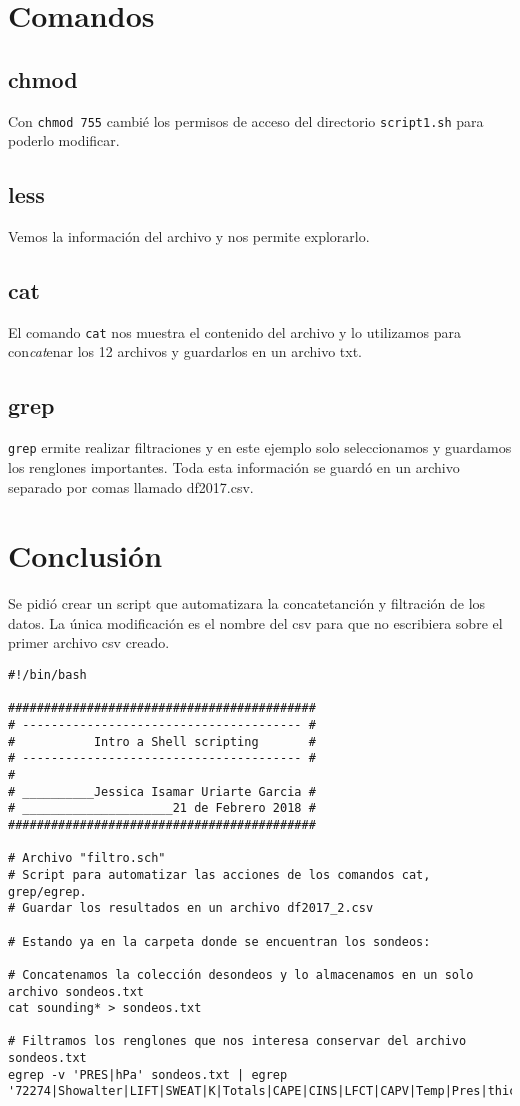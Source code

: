 \documentclass[12pt]{article}
\begin{document}
\section{Comandos}
\noindent

\subsection*{chmod}
Con \texttt{chmod 755} cambi\'e los permisos de acceso del directorio \texttt{script1.sh} para poderlo modificar. 
\subsection*{less}
Vemos la informaci\'on del archivo y nos permite explorarlo.
\subsection*{cat}
El comando \texttt{cat} nos muestra el contenido del archivo y lo utilizamos para con\textit{cat}enar los 12 archivos y guardarlos en un archivo txt.
\subsection*{grep}
\texttt{grep} ermite realizar filtraciones y en este ejemplo solo seleccionamos y guardamos los renglones importantes. Toda esta informaci\'on se guard\'o en un archivo separado por comas llamado df2017.csv.


\section{Conclusi\'on}
\noindent
Se pidi\'o crear un script que automatizara la concatetanci\'on y filtraci\'on de los datos. La \'unica modificaci\'on es el nombre del csv para que no escribiera sobre el primer archivo csv creado. 
\begin{verbatim}
#!/bin/bash

###########################################
# --------------------------------------- #
#           Intro a Shell scripting       #
# --------------------------------------- #
#
# __________Jessica Isamar Uriarte Garcia #
# _____________________21 de Febrero 2018 #
###########################################

# Archivo "filtro.sch"
# Script para automatizar las acciones de los comandos cat, grep/egrep.
# Guardar los resultados en un archivo df2017_2.csv

# Estando ya en la carpeta donde se encuentran los sondeos:

# Concatenamos la colección desondeos y lo almacenamos en un solo archivo sondeos.txt
cat sounding* > sondeos.txt

# Filtramos los renglones que nos interesa conservar del archivo sondeos.txt
egrep -v 'PRES|hPa' sondeos.txt | egrep '72274|Showalter|LIFT|SWEAT|K|Totals|CAPE|CINS|LFCT|CAPV|Temp|Pres|thick|Precip'>df2017_2.csv
\end{verbatim}
\end{document}

